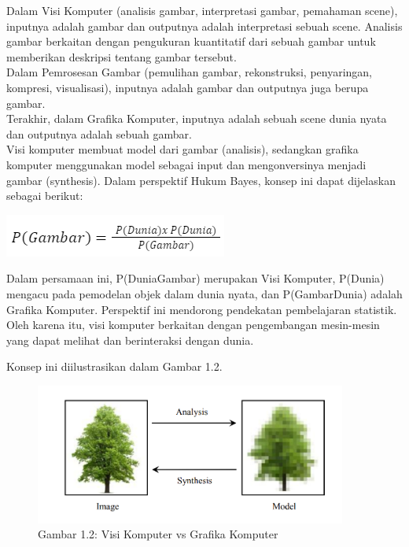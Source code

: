 \documentclass[
  letterpaper,
  DIV=11,
  numbers=noendperiod]{scrreprt}
\begin{document}
Dalam Visi Komputer (analisis gambar, interpretasi gambar, pemahaman
scene), inputnya adalah gambar dan outputnya adalah interpretasi sebuah
scene. Analisis gambar berkaitan dengan pengukuran kuantitatif dari
sebuah gambar untuk memberikan deskripsi tentang gambar tersebut.\\
Dalam Pemrosesan Gambar (pemulihan gambar, rekonstruksi, penyaringan,
kompresi, visualisasi), inputnya adalah gambar dan outputnya juga berupa
gambar.\\
Terakhir, dalam Grafika Komputer, inputnya adalah sebuah scene dunia
nyata dan outputnya adalah sebuah gambar.\\
Visi komputer membuat model dari gambar (analisis), sedangkan grafika
komputer menggunakan model sebagai input dan mengonversinya menjadi
gambar (synthesis). Dalam perspektif Hukum Bayes, konsep ini dapat
dijelaskan sebagai berikut:

\includegraphics{Asset/image3.png}

Dalam persamaan ini, P(Dunia\textbar Gambar) merupakan Visi Komputer,
P(Dunia) mengacu pada pemodelan objek dalam dunia nyata, dan
P(Gambar\textbar Dunia) adalah Grafika Komputer. Perspektif ini
mendorong pendekatan pembelajaran statistik. Oleh karena itu, visi
komputer berkaitan dengan pengembangan mesin-mesin yang dapat melihat
dan berinteraksi dengan dunia.

Konsep ini diilustrasikan dalam Gambar 1.2.\\

\begin{figure}

{\centering \includegraphics{Asset/image4.png}

}

\caption{Gambar 1.2: Visi Komputer vs Grafika Komputer}

\end{figure}
\end{document}
